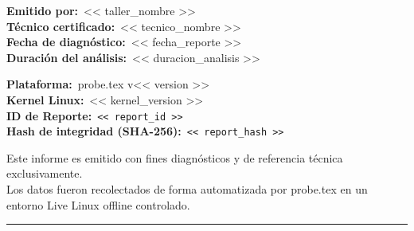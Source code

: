 \documentclass[11pt, a4paper, final]{article}
\begin{document}
\begin{minipage}[t]{0.48\linewidth}
  \small\color{AMSlate}
  \textbf{Emitido por:}\ << taller_nombre >>\\
  \textbf{Técnico certificado:}\ << tecnico_nombre >>\\
  \textbf{Fecha de diagnóstico:}\ << fecha_reporte >>\\
  \textbf{Duración del análisis:}\ << duracion_analisis >>
\end{minipage}
\hfill
\begin{minipage}[t]{0.48\linewidth}
  \raggedright\small\color{AMSlate}
  \textbf{Plataforma:}\ probe\textcolor{redtex}{.tex} v<< version >>\\
  \textbf{Kernel Linux:}\ << kernel_version >>\\
  \textbf{ID de Reporte:}\ \texttt{<< report_id >>}\\
  \textbf{Hash de integridad (SHA-256):}\ \texttt{\tiny << report_hash >>}
\end{minipage}

\vspace{0.5cm}

\begin{center}
  \scriptsize\color{AMSlate}
  Este informe es emitido con fines diagnósticos y de referencia técnica exclusivamente.\\
  Los datos fueron recolectados de forma automatizada por probe\textcolor{redtex}{.tex}
  en un entorno Live Linux offline controlado.\\[3pt]
  \textcolor{AMBorder}{\rule{0.45\linewidth}{0.3pt}}
\end{center}
\end{document}
